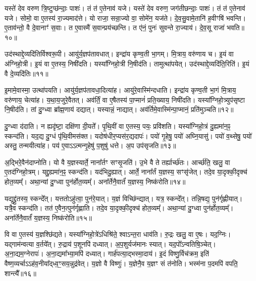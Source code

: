 यस्ते॑ देव वरुण त्रि॒ष्टुप्छ॑न्दाः॒ पाशः॑।
तं त॑ ए॒तेनाव॑ यजे।
यस्ते॑ देव वरुण॒ जग॑तीछन्दाः॒ पाशः॑।
तं त॑ ए॒तेनाव॑ यजे।
सोमो॒ वा ए॒तस्य॑ रा॒ज्यमाद॑त्ते।
यो राजा॒ सन्रा॒ज्यो वा॒ सोमे॑न॒ यज॑ते।
दे॒व॒सु॒वामे॒तानि॑ ह॒वीꣳषि॑ भवन्ति।
ए॒ताव॑न्तो॒ वै दे॒वानाꣳ॑ स॒वाः।
त ए॒वास्मै॑ स॒वान्प्रय॑च्छन्ति।
त ए॑नं॒ पुनः॑ सुवन्ते रा॒ज्याय॑।
दे॒व॒सू राजा॑ भवति॥१०॥\ip\anuvakamend[सोम॑ आवि॒शन् य॑जे रा॒ज्यायैकं॑ च]

उद॑स्थाद्दे॒व्यदि॑तिर्विश्वरू॒पी।
आयु॑र्य॒ज्ञप॑तावधात्।
इन्द्रा॑य कृण्व॒ती भा॒गम्।
मि॒त्राय॒ वरु॑णाय च।
इ॒यं वा अ॑ग्निहो॒त्री।
इ॒यं वा ए॒तस्य॒ निषी॑दति।
यस्या᳚ग्निहो॒त्री नि॒षीद॑ति।
तामुत्था॑पयेत्।
उद॑स्थाद्दे॒व्यदि॑ति॒रिति॑।
इ॒यं वै दे॒व्यदि॑तिः॥११॥\ip

इ॒मामे॒वास्मा॒ उत्था॑पयति।
आयु॑र्य॒ज्ञप॑तावधा॒दित्या॑ह।
आयु॑रे॒वा\-स्मि॑न्दधाति।
इन्द्रा॑य कृण्व॒ती भा॒गं मि॒त्राय॒ वरु॑णाय॒ चेत्या॑ह।
य॒था॒\-य॒जु\-रे॒वै\-तत्।
अव॑र्तिं॒ वा ए॒षैतस्य॑ पा॒प्मानं॑ प्रति॒ख्याय॒ निषी॑दति।
यस्या᳚ग्निहो॒त्र्युप॑सृष्टा नि॒षीद॑ति।
तां दु॒ग्ध्वा ब्रा᳚ह्म॒णाय॑ दद्यात्।
यस्यान्नं॒ नाद्यात्।
अव॑र्तिमे॒वास्मि॑न्पा॒प्मानं॒ प्रति॑\-मुञ्चति॥१२॥\ip

दु॒ग्ध्वा द॑दाति।
न ह्यदृ॑ष्टा॒ दक्षि॑णा दी॒यते᳚।
पृ॒थि॒वीं वा ए॒तस्य॒ पयः॒ प्रवि॑शति।
यस्या᳚ग्निहो॒त्रं दु॒ह्यमा॑न॒ꣴ॒ स्कन्द॑ति।
यद॒द्य दु॒ग्धं पृ॑थि॒वीमस॑क्त।
यदोष॑धीर॒प्यस॑र॒द्यदापः॑।
पयो॑ गृ॒हेषु॒ पयो॑ अघ्नि॒यासु॑।
पयो॑ व॒थ्सेषु॒ पयो॑ अस्तु॒ तन्मयीत्या॑ह।
पय॑ ए॒वाऽऽत्मन्गृ॒हेषु॑ प॒शुषु॑ धत्ते।
अ॒प उप॑\-सृजति॥१३॥\ip

अ॒द्भिरे॒वैन॑दाप्नोति।
यो वै य॒ज्ञस्यार्ते॒ नाना᳚र्तꣳ सꣳसृ॒जति॑।
उ॒भे वै ते तर्ह्यार्च्छ॑तः।
आर्च्छ॑ति॒ खलु॒ वा ए॒तद॑ग्निहो॒त्रम्।
यद्दु॒ह्यमा॑न॒ꣴ॒ स्कन्द॑ति।
यद॑भिदु॒ह्यात्।
आर्ते॒ नाना᳚र्तं य॒ज्ञस्य॒ सꣳसृ॑जेत्।
तदे॒व या॒दृक्की॒दृक्च॑ होत॒व्यम्᳚।
अथा॒न्यां दु॒ग्ध्वा पुन॑र्\mbox{}होत॒व्यम्᳚।
अना᳚र्तेनै॒वार्तं॑ य॒ज्ञस्य॒ निष्क॑रोति॥१४॥\ip

यद्युद्द्रु॑तस्य॒ स्कन्दे᳚त्।
यत्ततो\-ऽहु॑त्वा॒ पुन॑रे॒यात्।
य॒ज्ञं वि\-च्छि॑न्द्यात्।
यत्र॒ स्कन्दे᳚त्।
तन्नि॒षद्य॒ पुन॑र्गृह्णीयात्।
यत्रै॒व स्कन्द॑ति।
तत॑ ए॒वैन॒त्पुन॑र्गृह्णाति।
तदे॒व या॒दृक्की॒दृक्च॑ होत॒व्यम्᳚।
अथा॒न्यां दु॒ग्ध्वा पुन॑र्\mbox{}होत॒व्यम्᳚।
अना᳚र्तेनै॒वार्तं॑ य॒ज्ञस्य॒ निष्क॑रोति॥१५॥\ip

वि वा ए॒तस्य॑ य॒ज्ञश्छि॑द्यते।
यस्या᳚ग्निहो॒त्रे॑\-ऽधिश्रि॑ते॒ श्वा\-ऽन्त॒रा धाव॑ति।
रु॒द्रः खलु॒ वा ए॒षः।
यद॒ग्निः।
यद्गाम॑न्वत्या व॒र्तये᳚त्।
रु॒द्राय॑ प॒शूनपि॑ दध्यात्।
अ॒प॒शुर्यज॑मानः स्यात्।
यद॒पो᳚\-ऽन्वतिषि॒ञ्चेत्।
अ॒ना॒द्यम॒ग्नेरापः॑।
अ॒ना॒द्यमा᳚भ्या॒मपि॑ दध्यात्।
गार्\mbox{}ह॑पत्या॒द्भस्मा॒दाय॑।
इ॒दं विष्णु॒र्विच॑क्रम॒ इति॑ वैष्ण॒व्यर्चा\-ऽऽह॑व॒नीया᳚द्‌ध्व॒ꣳ॒सय॒न्नुद्र॑वेत्।
य॒ज्ञो वै विष्णुः॑।
य॒ज्ञेनै॒व य॒ज्ञꣳ सं त॑नोति।
भस्म॑ना प॒दमपि॑ वपति॒ शान्त्यै᳚॥१६॥\ip\anuvakamend[वै दे॒व्यदि॑तिर्मुञ्चति \-सृजति करोति करोत्याभ्या॒मपि॑ दध्या॒त् पञ्च॑ च]

